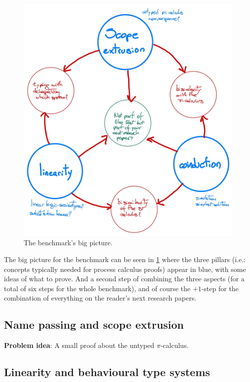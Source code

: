 \documentclass{jfp}
\begin{document}
\begin{figure}[h]
  \centering
  \includegraphics[width=\textwidth]{images/benchmark.jpeg}
  \caption{The benchmark's big picture.}
  \label{fig:bigpic}
\end{figure}

The big picture for the benchmark can be seen in \cref{fig:bigpic}
where the three pillars (i.e.: concepts typically needed for process
calculus proofs) appear in blue, with some ideas of what to prove. And
a second step of combining the three aspects (for a total of six steps
for the whole benchmark), and of course the $+1$-step for the
combination of everything on the reader's next research papers.

\subsection{Name passing and scope extrusion}

\textbf{Problem idea}: A small proof about the untyped $\pi$-calculus.

\subsection{Linearity and behavioural type systems}
\end{document}
